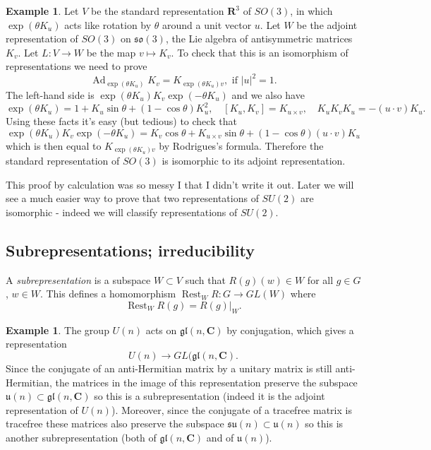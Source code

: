 \documentclass[12pt]{article}
\newcommand{\CC}{\mathbf{C}}
\newcommand{\RR}{\mathbf{R}}
\newcommand{\OP}{\operatorname}
\newcommand{\Ad}{\OP{Ad}}
\theoremstyle{definition}
\newtheorem{exm}[thm]{Example}
\theoremstyle{check}
\theoremstyle{remark}
\theoremstyle{TheoremNum}
\begin{document}
\begin{exm}
Let $V$ be the standard representation $\RR^3$ of $SO(3)$, in which $\exp(\theta K_u)$ acts like rotation by $\theta$ around a unit vector $u$. Let $W$ be the adjoint representation of $SO(3)$ on $\mathfrak{so}(3)$, the Lie algebra of antisymmetric matrices $K_v$. Let $L\colon V\to W$ be the map $v\mapsto K_v$. To check that this is an isomorphism of representations we need to prove
\[\Ad_{\exp(\theta K_u)}K_v=K_{\exp(\theta K_u)v},\mbox{ if }|u|^2=1.\]
The left-hand side is $\exp(\theta K_u)K_v\exp(-\theta K_u)$ and we also have
\[\exp(\theta K_u)=1+K_u\sin\theta+(1-\cos\theta)K_u^2,\quad [K_u,K_v]=K_{u\times v},\quad K_uK_vK_u=-(u\cdot v)K_u.\]
Using these facts it's easy (but tedious) to check that
\[\exp(\theta K_u)K_v\exp(-\theta K_u)=K_v\cos\theta+K_{u\times v}\sin\theta+(1-\cos\theta)(u\cdot v)K_u\]
which is then equal to $K_{\exp(\theta K_u)v}$ by Rodrigues's formula. Therefore the standard representation of $SO(3)$ is isomorphic to its adjoint representation.
\end{exm}

This proof by calculation was so messy I that I didn't write it out. Later we will see a much easier way to prove that two representations of $SU(2)$ are isomorphic - indeed we will classify representations of $SU(2)$.

\subsection{Subrepresentations; irreducibility}

A {\em subrepresentation} is a subspace $W\subset V$ such that $R(g)(w)\in W$ for all $g\in G$, $w\in W$. This defines a homomorphism $\OP{Rest}_WR\colon G\to GL(W)$ where
\[\OP{Rest}_WR(g)=R(g)|_W.\]
\begin{exm}
The group $U(n)$ acts on $\mathfrak{gl}(n,\CC)$ by conjugation, which gives a representation
\[U(n)\to GL(\mathfrak{gl}(n,\CC).\]
Since the conjugate of an anti-Hermitian matrix by a unitary matrix is still anti-Hermitian, the matrices in the image of this representation preserve the subspace $\mathfrak{u}(n)\subset\mathfrak{gl}(n,\CC)$ so this is a subrepresentation (indeed it is the adjoint representation of $U(n)$). Moreover, since the conjugate of a tracefree matrix is tracefree these matrices also preserve the subspace $\mathfrak{su}(n)\subset\mathfrak{u}(n)$ so this is another subrepresentation (both of $\mathfrak{gl}(n,\CC)$ and of $\mathfrak{u}(n)$).
\end{exm}
\end{document}
